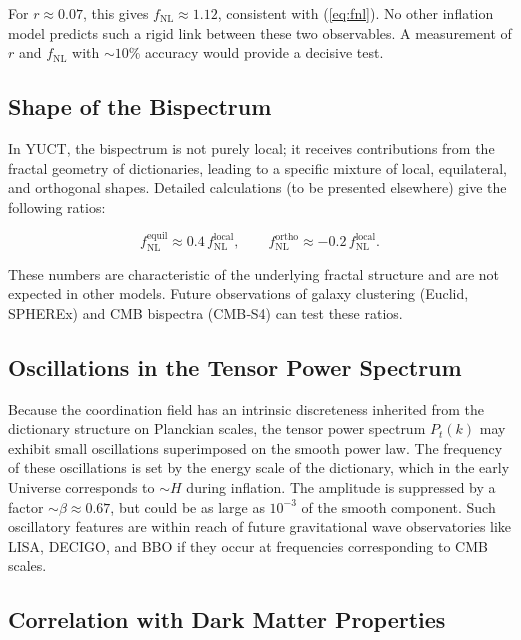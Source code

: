 \documentclass[12pt]{article}
\theoremstyle{remark}
\begin{document}
	For $r \approx 0.07$, this gives $f_{\text{NL}} \approx 1.12$, consistent with (\ref{eq:fnl}). No other inflation model predicts such a rigid link between these two observables. A measurement of $r$ and $f_{\text{NL}}$ with $\sim 10\%$ accuracy would provide a decisive test.
	
	\subsection{Shape of the Bispectrum}
	
	In YUCT, the bispectrum is not purely local; it receives contributions from the fractal geometry of dictionaries, leading to a specific mixture of local, equilateral, and orthogonal shapes. Detailed calculations (to be presented elsewhere) give the following ratios:
	
	\begin{equation}
		f_{\text{NL}}^{\text{equil}} \approx 0.4\, f_{\text{NL}}^{\text{local}}, \qquad
		f_{\text{NL}}^{\text{ortho}} \approx -0.2\, f_{\text{NL}}^{\text{local}}.
		\label{eq:fnl-shapes}
	\end{equation}
	
	These numbers are characteristic of the underlying fractal structure and are not expected in other models. Future observations of galaxy clustering (Euclid, SPHEREx) and CMB bispectra (CMB‑S4) can test these ratios.
	
	\subsection{Oscillations in the Tensor Power Spectrum}
	
	Because the coordination field has an intrinsic discreteness inherited from the dictionary structure on Planckian scales, the tensor power spectrum $P_t(k)$ may exhibit small oscillations superimposed on the smooth power law. The frequency of these oscillations is set by the energy scale of the dictionary, which in the early Universe corresponds to $\sim H$ during inflation. The amplitude is suppressed by a factor $\sim \beta \approx 0.67$, but could be as large as $10^{-3}$ of the smooth component. Such oscillatory features are within reach of future gravitational wave observatories like LISA, DECIGO, and BBO if they occur at frequencies corresponding to CMB scales.
	
	\subsection{Correlation with Dark Matter Properties}
	
\end{document}
